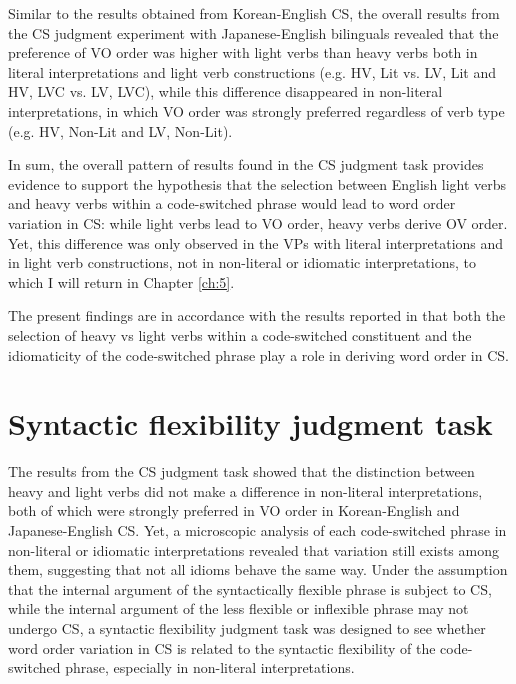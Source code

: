 Similar to the results obtained from Korean-English \ac{CS}, the overall results from the \ac{CS} judgment experiment with Japanese-English bilinguals revealed that the preference of \ac{VO} order was higher with light verbs than heavy verbs both in literal interpretations and light verb constructions (e.g. \ac{HV}, Lit vs. \ac{LV}, Lit and \ac{HV}, \ac{LVC} vs. \ac{LV}, \ac{LVC}), while this difference disappeared in non-literal interpretations, in which \ac{VO} order was strongly preferred regardless of verb type (e.g. \ac{HV}, Non-Lit and \ac{LV}, Non-Lit).

In sum, the overall pattern of results found in the \ac{CS} judgment task provides evidence to support the hypothesis that the selection between English light verbs and heavy verbs within a code-switched phrase would lead to word order variation in \ac{CS}: while light verbs lead to \ac{VO} order, heavy verbs derive \ac{OV} order. Yet, this difference was only observed in the \acp{VP} with literal interpretations and in light verb constructions, not in non-literal or idiomatic interpretations, to which I will return in Chapter \ref{ch:5}. 

The present findings are in accordance with the results reported in \citet{Shim2011} that both the selection of heavy vs light verbs within a code-switched constituent and the idiomaticity of the code-switched phrase play a role in deriving word order in \ac{CS}. 

\section{Syntactic flexibility judgment task}\label{ch2:sect:2.2}

The results from the \ac{CS} judgment task showed that the distinction between heavy and light verbs did not make a difference in non-literal interpretations, both of which were strongly preferred in \ac{VO} order in Korean-English and Japanese-English \ac{CS}. Yet, a microscopic analysis of each code-switched phrase in non-literal or idiomatic interpretations revealed that variation still exists among them, suggesting that not all idioms behave the same way. Under the assumption that the internal argument of the syntactically flexible phrase is subject to \ac{CS}, while the internal argument of the less flexible or inflexible phrase may not undergo \ac{CS}, a syntactic flexibility judgment task was designed to see whether word order variation in \ac{CS} is related to the syntactic flexibility of the code-switched phrase, especially in non-literal interpretations. 

